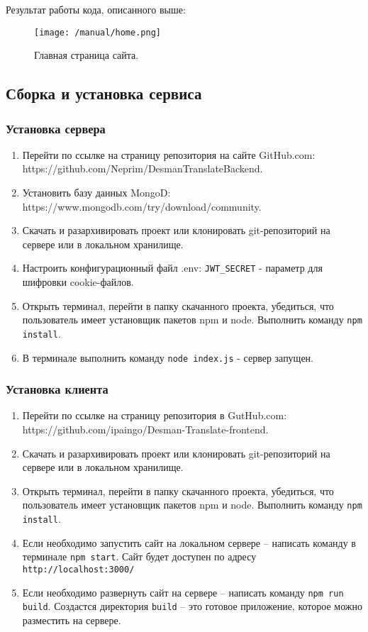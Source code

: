 \documentclass[a4paper,12pt]{article}
\begin{document}
Результат работы кода, описанного выше:

\begin{figure}[H]
\centering
\texttt{[image: /manual/home.png]}
\caption{Главная страница сайта.}
\label{fig:pagehome}
\end{figure}

\subsection{Сборка и установка сервиса}

\subsubsection{Установка сервера}
\begin{enumerate}
\item Перейти по ссылке на страницу репозитория на сайте GitHub.com: https://github.com/Neprim/DesmanTranslateBackend.
\item Установить базу данных MongoD: https://www.mongodb.com/try/download/community.
\item Скачать и разархивировать проект или клонировать git-репозиторий на сервере или в локальном хранилище.
\item Настроить конфигурационный файл .env: \verb|JWT_SECRET| - параметр для шифровки cookie-файлов.
\item Открыть терминал, перейти в папку скачанного проекта, убедиться, что пользователь имеет установщик пакетов npm и node. Выполнить команду \verb|npm install|.
\item В терминале выполнить команду \verb|node index.js| - сервер запущен.
\end{enumerate}

\subsubsection{Установка клиента}
\begin{enumerate}
\item Перейти по ссылке на страницу репозитория в GutHub.com: https://github.com/ipaingo/Desman-Translate-frontend.
\item Скачать и разархивировать проект или клонировать git-репозиторий на сервере или в локальном хранилище.
\item Открыть терминал, перейти в папку скачанного проекта, убедиться, что пользователь имеет установщик пакетов npm и node. Выполнить команду \verb|npm install|.
\item Если необходимо запустить сайт на локальном сервере – написать команду в терминале \verb|npm start|. Сайт будет доступен по адресу \verb|http://localhost:3000/|
\item Если необходимо развернуть сайт на сервере – написать команду \verb|npm run build|. Создастся директория \verb|build| – это готовое приложение, которое можно разместить на сервере.
\end{enumerate}
\end{document}
